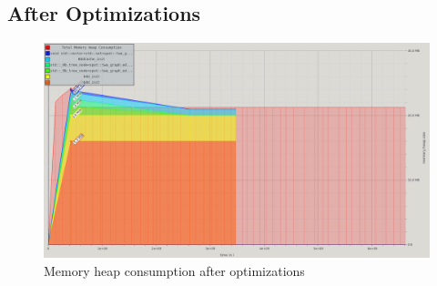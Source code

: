 \begin{landscape}
\subsection{After Optimizations}
\begin{figure}[H]
 \centering
 \includegraphics[scale=0.6]{img/memory_now.png}
 \caption{Memory heap consumption after optimizations}
 \label{fig:memory_now}
\end{figure}

\end{landscape}
